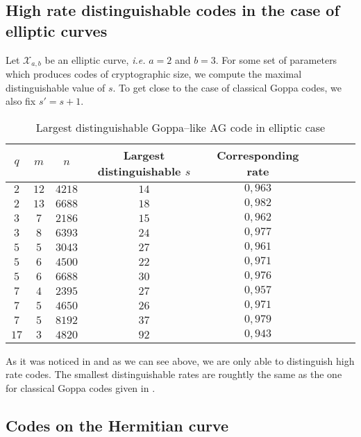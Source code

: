 \documentclass[a4paper]{article}
\theoremstyle{definition}
\theoremstyle{remark}
\newcommand{\calX}{\mathcal{X}}
\begin{document}
\subsection{High rate distinguishable codes in the case of elliptic curves}

Let $\calX_{a,b}$ be an elliptic curve, \emph{i.e.} $a=2$ and $b=3$. For some set of parameters which produces codes of cryptographic size, we compute the maximal distinguishable value of $s$. To get close to the case of classical Goppa codes, we also fix $s'=s+1$.
\begin{table}[h]
\begin{center}
\begin{tabular}{|c|c|c||c|c|c|c|c|c|}
    \hline
    $q$ & $m$ & $n$ & Largest distinguishable $s$ & Corresponding rate\\
    \hline \hline
     $2$ & $12$ & $4218$ & $14$ & $0,963$ \\
    \hline 
     $2$ & $13$ & $6688$ & $18$ & $0,982$  \\
    \hline \hline
     $3$ & $7$ & $2186$ & $15$ & $0,962$ \\
    \hline
     $3$ & $8$ & $6393$ & $24$ & $0,977$ \\
    \hline \hline
     $5$ & $5$ & $3043$ & $27$ & $0,961$  \\
    \hline
     $5$ & $6$ & $4500$ & $22$ & $0,971$ \\
    \hline
     $5$  & $6$ & $6688$ & $30$ & $0,976$ \\
    \hline \hline
     $7$ & $4$ & $2395$ & $27$ & $0,957$ \\
    \hline
      $7$ & $5$ & $4650$ & $26$ & $0,971$ \\
    \hline
      $7$ & $5$ & $8192$ & $37$ & $0,979$ \\
    \hline \hline
      $17$ & $3$ & $4820$ & $92$ & $0,943$ \\
    \hline
\end{tabular}
\caption{Largest distinguishable Goppa--like AG code in elliptic case}
\end{center}
\end{table}

As it was noticed in \cite{MT21} and as we can see above, we are only able to distinguish high rate codes. The smallest distinguishable rates are roughtly the same as the one for classical Goppa codes given in \cite{MT21}. 

\subsection{Codes on the Hermitian curve}
\end{document}
